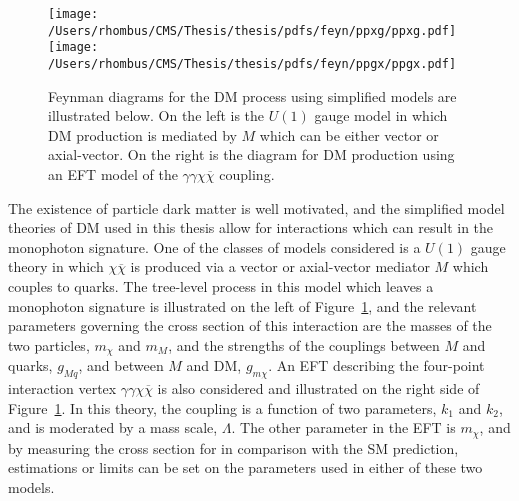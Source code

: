 \begin{figure}[!h]
 \center
 \caption[Feynman diagrams for dark matter  monophoton]{
  Feynman diagrams for the DM process
   \pploneg using simplified models
   are illustrated below.
  On the left is the $U(1)$ gauge
   model in which DM production
   is mediated by $M$ which can 
   be either vector or axial-vector.
  On the right is the diagram for 
   DM production using an 
   EFT model of the $\gamma\gamma\chi\overline{\chi}$
   coupling.
 } 
 \texttt{[image: /Users/rhombus/CMS/Thesis/thesis/pdfs/feyn/ppxg/ppxg.pdf]}
 \texttt{[image: /Users/rhombus/CMS/Thesis/thesis/pdfs/feyn/ppgx/ppgx.pdf]}
    \label{fig:ppxgfeyn}
\end{figure}

 The existence of particle dark matter
  is well motivated, and the simplified
  model theories of DM used in this thesis allow
  for interactions which can result in
  the monophoton signature.
 One of the classes of models considered is a $U(1)$
  gauge theory in which $\chi\overline{\chi}$
  is produced via a vector or axial-vector mediator $M$
  which couples to quarks. 
 The tree-level process in this model which leaves
  a  monophoton signature 
  is illustrated on the left of
  Figure~\ref{fig:ppxgfeyn}, and the
  relevant parameters governing
  the cross section of this interaction are
  the masses of the two particles, $m_\chi$
  and $m_M$, and the strengths of the couplings
  between $M$ and quarks, $g_{Mq}$,
  and between $M$ and DM, $g_{m\chi}$.
 An EFT describing the four-point interaction
  vertex $\gamma\gamma\chi\overline{\chi}$ is also
  considered and illustrated on the right side of
  Figure~\ref{fig:ppxgfeyn}.
 In this theory, the coupling is a function
  of two parameters, $k_1$ and $k_2$,
  and is moderated by a mass scale, $\Lambda$.
 The other parameter in the EFT is $m_\chi$,
  and by measuring the cross section for
  \pploneg in comparison with the SM prediction,
  estimations or limits can be set on 
  the parameters used in either of these
  two models.
  
